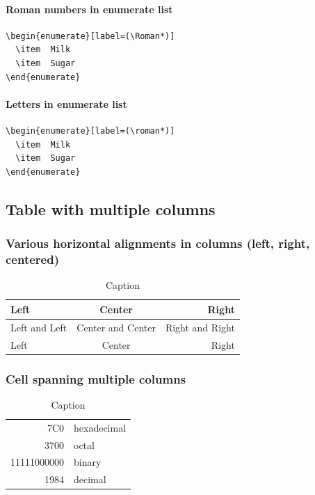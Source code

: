 \paragraph{Roman numbers in enumerate list}
\begin{verbatim}
\begin{enumerate}[label=(\Roman*)]
  \item  Milk
  \item  Sugar
\end{enumerate}
\end{verbatim}

\paragraph{Letters in enumerate list}
\begin{verbatim}
\begin{enumerate}[label=(\roman*)]
  \item  Milk
  \item  Sugar
\end{enumerate}
\end{verbatim}

\subsection{Table with multiple columns}

\subsubsection{Various horizontal alignments in columns (left, right, centered)}

\begin{table}[htp]
    \centering
\begin{tabular}{ | l | c | r | }
\hline
  Left & Center & Right \\ \hline
  Left and Left & Center and Center & Right and Right \\ \hline
  Left & Center & Right \\
\hline
\end{tabular}
    \caption{Caption}
    \label{tab:my_label_1}
\end{table}



\subsubsection{Cell spanning multiple columns}
\begin{table}[htp]
    \centering
    \begin{tabular}{|r|l|}
    \hline
     7C0 & hexadecimal \\
     3700 & octal \\ \cline{2-2}
     11111000000 & binary \\
     \hline \hline
     1984 & decimal \\
    \hline
    \end{tabular}
    \caption{Caption}
    \label{tab:my_label_2}
\end{table}

